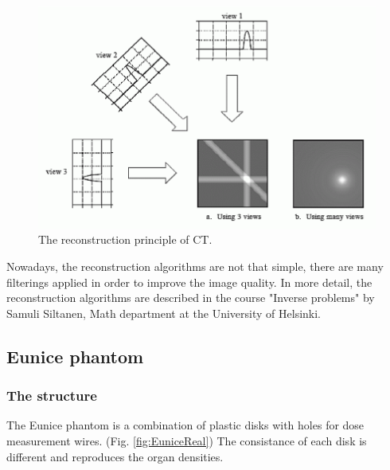 \documentclass[fleqn,10pt]{SelfArx} %
\begin{document}
\begin{figure}[ht]\centering
\includegraphics[width=0.9\linewidth]{Tomo_2}
\caption{The reconstruction principle of CT.}
\label{fig:Tomo_2}
\end{figure}

Nowadays, the reconstruction algorithms are not that simple, there are many filterings applied in order to improve the image quality. In more detail, the reconstruction algorithms are described in the course "Inverse problems" by Samuli Siltanen, Math department at the University of Helsinki.


\subsection{Eunice phantom}

\subsubsection{The structure}
The Eunice phantom is a combination of plastic disks with holes for dose measurement wires. (Fig. \ref{fig:EuniceReal}) The consistance of each disk is different and reproduces the organ densities.
\end{document}
